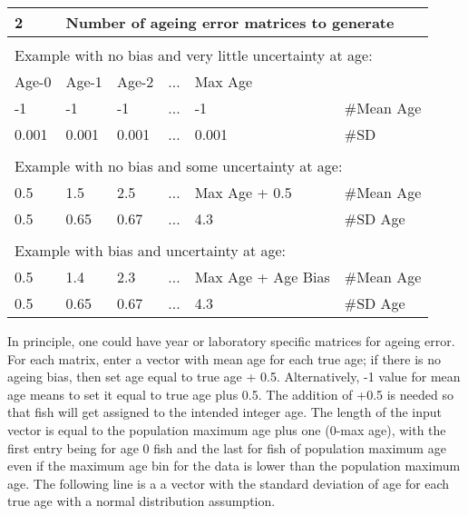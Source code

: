 \begin{center}
	\begin{tabular}{p{2cm} p{2cm} p{2cm} p{2cm} p{3.5cm} p{2.5cm} }
		\hline
		\multicolumn{1}{l}{2} & \multicolumn{5}{l}{Number of ageing error matrices to generate}\Tstrut\Bstrut\\
		\hline\\
		\multicolumn{6}{l}{Example with no bias and very little uncertainty at age:}\Tstrut\Bstrut\\
		\hline
		Age-0 & Age-1 & Age-2  &  ... & Max Age & \Tstrut\Bstrut\\
		\hline
		-1 & -1 & -1  & ... & -1  & \#Mean Age\Tstrut\\
		0.001 & 0.001 & 0.001 & ... & 0.001 & \#SD\Bstrut\\
		\hline\\
		\multicolumn{6}{l}{Example with no bias and some uncertainty at age:}\Tstrut\Bstrut\\
		\hline
		0.5 & 1.5 & 2.5 & ... & Max Age + 0.5 & \#Mean Age\Tstrut\\
		0.5 & 0.65 & 0.67 & ... & 4.3 & \#SD Age\Bstrut\\
		\hline\\
		\multicolumn{6}{l}{Example with bias and uncertainty at age:}\Tstrut\Bstrut\\
		\hline
		0.5 & 1.4 & 2.3 & ... & Max Age + Age Bias & \#Mean Age\Tstrut\\
		0.5 & 0.65 & 0.67 & ... & 4.3 & \#SD Age\Bstrut\\
		\hline
	\end{tabular}
\end{center}

In principle, one could have year or laboratory specific matrices for ageing error. For each matrix, enter a vector with mean age for each true age; if there is no ageing bias, then set age equal to true age + 0.5.  Alternatively, -1 value for mean age means to set it equal to true age plus 0.5.  The addition of +0.5 is needed so that fish will get assigned to the intended integer age. The length of the input vector is equal to the population maximum age plus one (0-max age), with the first entry being for age 0 fish and the last for fish of population maximum age even if the maximum age bin for the data is lower than the population maximum age. The following line is a a vector with the standard deviation of age for each true age with a normal distribution assumption.

